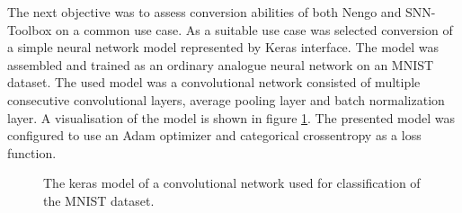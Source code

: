 The next objective was to assess conversion abilities of both Nengo and SNN-Toolbox on a common use case. As a suitable use case was selected conversion of a simple neural network model represented by Keras interface. The model was assembled and trained as an ordinary analogue neural network on an MNIST dataset. The used model was a convolutional network consisted of multiple consecutive convolutional layers, average pooling layer and batch normalization layer. A visualisation of the model is shown in figure \ref{fig:keras_model}. The presented model was configured to use an Adam optimizer and categorical crossentropy as a loss function.
\begin{figure}[htbp]
    \centering
    
    \caption{The keras model of a convolutional network used for classification of the MNIST dataset.}
    \label{fig:keras_model}
\end{figure}